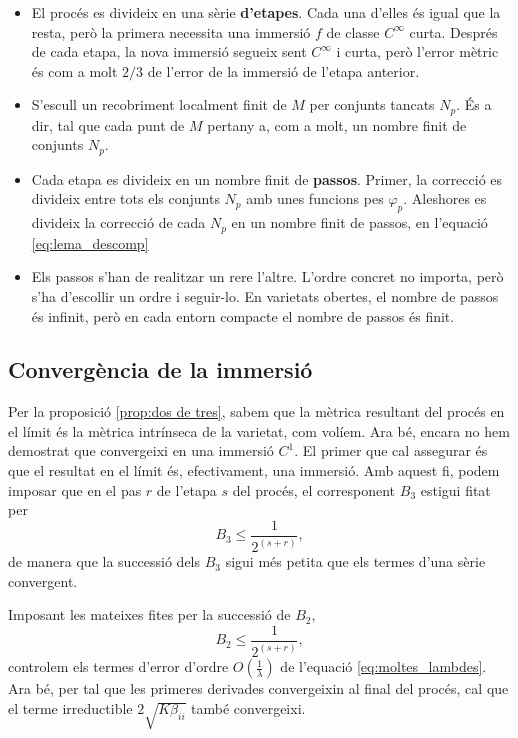 \begin{itemize}
    \item El procés es divideix en una sèrie \textbf{d'etapes}. Cada una d'elles és igual que la resta, però la primera necessita una immersió $f$ de classe $C^\infty$ curta. Després de cada etapa, la nova immersió segueix sent $C^\infty$ i curta, però l'error mètric és com a molt $2/3$ de l'error de la immersió de l'etapa anterior.
    \item S'escull un recobriment localment finit de $M$ per conjunts tancats $N_p$. És a dir, tal que cada punt de $M$ pertany a, com a molt, un nombre finit de conjunts $N_p$.
    \item Cada etapa es divideix en un nombre finit de \textbf{passos}. Primer, la correcció es divideix entre tots els conjunts $N_p$ amb unes funcions pes $\varphi_p$. Aleshores es divideix la correcció de cada $N_p$ en un nombre finit de passos, en l'equació \eqref{eq:lema_descomp}
    \item Els passos s'han de realitzar un rere l'altre. L'ordre concret no importa, però s'ha d'escollir un ordre i seguir-lo. En varietats obertes, el nombre de passos és infinit, però en cada entorn compacte el nombre de passos és finit.
\end{itemize}

\subsection{Convergència de la immersió}
Per la proposició \ref{prop:dos de tres}, sabem que la mètrica resultant del procés en el límit és la mètrica intrínseca de la varietat, com volíem. Ara bé, encara no hem demostrat que convergeixi en una immersió $C^1$. El primer que cal assegurar és que el resultat en el límit és, efectivament, una immersió. Amb aquest fi, podem imposar que en el pas $r$ de l'etapa $s$ del procés, el corresponent $B_3$ estigui fitat per
\begin{equation}\label{eq:b3_cota}
    B_{3} \le \frac1{2^{(s+r)}},
\end{equation}
de manera que la successió dels $B_3$ sigui més petita que els termes d'una sèrie convergent.

Imposant les mateixes fites per la successió de $B_2$, 
\begin{equation}
    B_2 \le \frac1{2^{(s+r)}},
\end{equation}
controlem els termes d'error d'ordre $O\left(\frac1{\lambda}\right)$ de l'equació \eqref{eq:moltes_lambdes}. Ara bé, per tal que les primeres derivades convergeixin al final del procés, cal que el terme irreductible $2\sqrt{K\beta_{ii}}$ també convergeixi.

